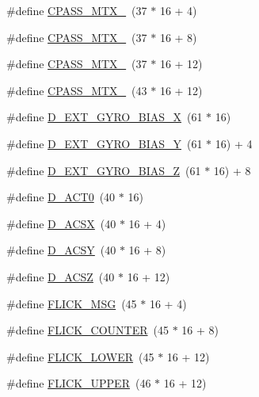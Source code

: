 \begin{DoxyCompactItemize}
\item 
\#define \hyperlink{group___d_r_i_v_e_r_s_ga5f4053bd26eb944d431d93d282be9296}{C\+P\+A\+S\+S\+\_\+\+M\+T\+X\+\_}~(37 $\ast$ 16 + 4)
\item 
\#define \hyperlink{group___d_r_i_v_e_r_s_ga452f20a72e035275b876e8cc592691f6}{C\+P\+A\+S\+S\+\_\+\+M\+T\+X\+\_}~(37 $\ast$ 16 + 8)
\item 
\#define \hyperlink{group___d_r_i_v_e_r_s_gae126c2fef7bf856f38d6d04b7504a3c4}{C\+P\+A\+S\+S\+\_\+\+M\+T\+X\+\_}~(37 $\ast$ 16 + 12)
\item 
\#define \hyperlink{group___d_r_i_v_e_r_s_gab45a80c778b591671aa8f10a64209423}{C\+P\+A\+S\+S\+\_\+\+M\+T\+X\+\_}~(43 $\ast$ 16 + 12)
\item 
\#define \hyperlink{group___d_r_i_v_e_r_s_gae48ad5d76a4abec0759ff23ba2b2a68e}{D\+\_\+\+E\+X\+T\+\_\+\+G\+Y\+R\+O\+\_\+\+B\+I\+A\+S\+\_\+X}~(61 $\ast$ 16)
\item 
\#define \hyperlink{group___d_r_i_v_e_r_s_ga6de6f7302f19c1f63f1a04b51ff14b1a}{D\+\_\+\+E\+X\+T\+\_\+\+G\+Y\+R\+O\+\_\+\+B\+I\+A\+S\+\_\+Y}~(61 $\ast$ 16) + 4
\item 
\#define \hyperlink{group___d_r_i_v_e_r_s_gacd6dead1c0b0458f1ec5d66914a1cf90}{D\+\_\+\+E\+X\+T\+\_\+\+G\+Y\+R\+O\+\_\+\+B\+I\+A\+S\+\_\+Z}~(61 $\ast$ 16) + 8
\item 
\#define \hyperlink{group___d_r_i_v_e_r_s_ga5d68a8e4a168cc789fb481ba9b1ac431}{D\+\_\+\+A\+C\+T0}~(40 $\ast$ 16)
\item 
\#define \hyperlink{group___d_r_i_v_e_r_s_ga3d6aba10b057d1b66f0c5f33334afb07}{D\+\_\+\+A\+C\+SX}~(40 $\ast$ 16 + 4)
\item 
\#define \hyperlink{group___d_r_i_v_e_r_s_ga289d47aab7f881d4e0c1233229462644}{D\+\_\+\+A\+C\+SY}~(40 $\ast$ 16 + 8)
\item 
\#define \hyperlink{group___d_r_i_v_e_r_s_gaae2baed3a317cde49f3ab8af10e73e97}{D\+\_\+\+A\+C\+SZ}~(40 $\ast$ 16 + 12)
\item 
\#define \hyperlink{group___d_r_i_v_e_r_s_ga045a0c3dbfc3523917e914681f437c3f}{F\+L\+I\+C\+K\+\_\+\+M\+SG}~(45 $\ast$ 16 + 4)
\item 
\#define \hyperlink{group___d_r_i_v_e_r_s_gae0cb172ae789a96d344d5dd008aca254}{F\+L\+I\+C\+K\+\_\+\+C\+O\+U\+N\+T\+ER}~(45 $\ast$ 16 + 8)
\item 
\#define \hyperlink{group___d_r_i_v_e_r_s_ga2e56bca3c291c9a618b572307216ec1d}{F\+L\+I\+C\+K\+\_\+\+L\+O\+W\+ER}~(45 $\ast$ 16 + 12)
\item 
\#define \hyperlink{group___d_r_i_v_e_r_s_gadf0738d3c6f0096ecb157aa2b296f1e1}{F\+L\+I\+C\+K\+\_\+\+U\+P\+P\+ER}~(46 $\ast$ 16 + 12)

\end{DoxyCompactItemize}
